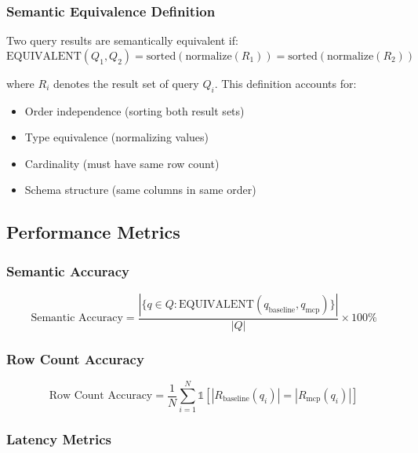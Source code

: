 \subsubsection{Semantic Equivalence Definition}

Two query results are semantically equivalent if:
\begin{equation}
\text{EQUIVALENT}(Q_1, Q_2) = \text{sorted}(\text{normalize}(R_1)) = \text{sorted}(\text{normalize}(R_2))
\end{equation}

where $R_i$ denotes the result set of query $Q_i$. This definition accounts for:
\begin{itemize}
    \item Order independence (sorting both result sets)
    \item Type equivalence (normalizing values)
    \item Cardinality (must have same row count)
    \item Schema structure (same columns in same order)
\end{itemize}

\subsection{Performance Metrics}

\subsubsection{Semantic Accuracy}

\begin{equation}
\text{Semantic Accuracy} = \frac{|\{q \in Q : \text{EQUIVALENT}(q_{\text{baseline}}, q_{\text{mcp}})\}|}{|Q|} \times 100\%
\end{equation}

\subsubsection{Row Count Accuracy}

\begin{equation}
\text{Row Count Accuracy} = \frac{1}{N}\sum_{i=1}^{N}\mathbb{1}[|R_{\text{baseline}}(q_i)| = |R_{\text{mcp}}(q_i)|]
\end{equation}

\subsubsection{Latency Metrics}

